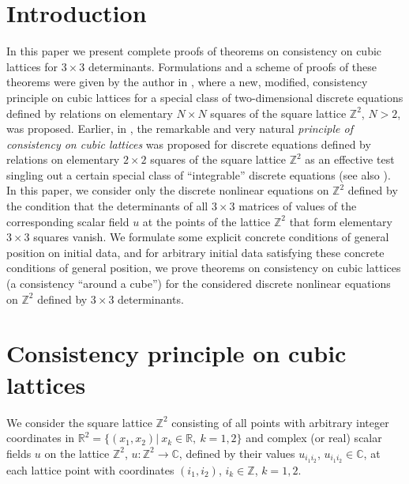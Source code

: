 \documentclass[pdftex]{sigma}
\begin{document}



\renewcommand{\thefootnote}{\arabic{footnote}}
\setcounter{footnote}{0}

\section{Introduction}

In this paper we present complete proofs of theorems on consistency
on cubic lattices for $3 \times 3$ determinants. Formulations and a
scheme of proofs of these theorems were given by the author in \cite{1,
2}, where a new, modif\/ied, consistency principle on cubic lattices
for a special class of two-dimensional discrete equations def\/ined by
relations on elementary $N \times N$ squares of the square lattice
$\mathbb{Z}^2$, $N > 2$, was proposed. Earlier, in \cite{3, 4, 5}, the
remarkable and very natural {\it principle of consistency on cubic
lattices} was proposed for discrete equations def\/ined by relations
on elementary $2 \times 2$ squares of the square lattice
$\mathbb{Z}^2$ as an ef\/fective test singling out a certain special
class of ``integrable'' discrete equations (see also \cite{6, 7, 8, 9, 10, 11, 12, 13, 14}). In
this paper, we consider only the discrete nonlinear equations on
$\mathbb{Z}^2$ def\/ined by the condition that the determinants of all
$3 \times 3$ matrices of values of the corresponding scalar f\/ield
$u$ at the points of the lattice $\mathbb{Z}^2$ that form elementary
$3 \times 3$ squares vanish. We formulate some explicit concrete
conditions of general position on initial data, and for arbitrary
initial data satisfying these concrete conditions of general
position, we prove theorems on consistency on cubic lattices (a consistency ``around a cube'') for the
considered discrete nonlinear equations on $\mathbb{Z}^2$ def\/ined by
$3 \times 3$ determinants.



\section{Consistency principle on cubic lattices}


We consider the square lattice $\mathbb{Z}^2$ consisting of all points
with arbitrary integer coordinates in $\mathbb{R}^2 = \{ (x_1, x_2)| \ x_k \in
\mathbb{R},\ k =1, 2 \}$ and complex (or real) scalar f\/ields $u$ on
the lattice $\mathbb{Z}^2$, $u : \mathbb{Z}^2 \rightarrow
\mathbb{C}$, def\/ined by their values $u_{i_1 i_2}$, $u_{i_1 i_2} \in
\mathbb{C}$, at each lattice point with coordinates $(i_1, i_2)$,
$i_k \in \mathbb{Z}$, $k = 1, 2$.
\end{document}
